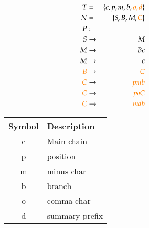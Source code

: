 \documentclass[a4paper,10pt]{article}
\newcommand{\captionVSpace}{\vspace*{-0.05cm}}
\newcommand{\CFGDefinitionSize}{0.60}
\newcommand{\SymbolDescriptionTable}{0.35}
\newcommand{\colorNew}{orange}
\begin{document}
\begin{figure}[H]
    \begin{minipage}[l]{\CFGDefinitionSize\textwidth}
        $$
        \begin{aligned}
            T &=& \{c, p, m, b, {\color{\colorNew}o, d}\} \\
            N &=& \{S, B, M, {\color{\colorNew}C}\} \\
            P &:& \\
            S &\rightarrow& M \\
            M &\rightarrow& Bc \\
            M &\rightarrow& c \\
            {\color{\colorNew}B} &\rightarrow& {\color{\colorNew}C} \\
            {\color{\colorNew}C} &\rightarrow& {\color{\colorNew}pmb} \\
            {\color{\colorNew}C} &\rightarrow& {\color{\colorNew}poC} \\
            {\color{\colorNew}C} &\rightarrow& {\color{\colorNew}mdb} \\
        \end{aligned}
        $$
        \caption{CFG with multiple branches and same length. Several usage of $C \rightarrow poC$ creates successive positions.}
        \label{fig:CFGWithMultipleBranchesAtTheSameLength}
    \end{minipage}
    \begin{minipage}[r]{\SymbolDescriptionTable\textwidth}
        \begin{table}[H]
        \centering
            \begin{tabular}{c|l}
                \toprule
                \textbf{Symbol} & \textbf{Description} \\
                \midrule
                c & Main chain \\
                p & position \\
                m & minus char \\
                b & branch \\
                o & comma char \\
                d & summary prefix \\
                \bottomrule
            \end{tabular}
        \end{table}
    \end{minipage}
\end{figure}
\end{document}
